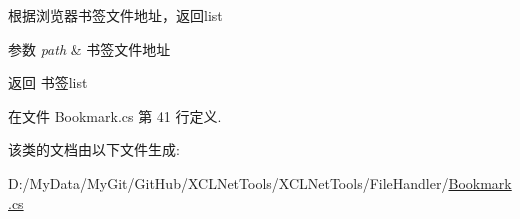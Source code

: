 根据浏览器书签文件地址，返回list 


\begin{DoxyParams}{参数}
{\em path} & 书签文件地址\\
\hline
\end{DoxyParams}
\begin{DoxyReturn}{返回}
书签list
\end{DoxyReturn}


在文件 Bookmark.\-cs 第 41 行定义.



该类的文档由以下文件生成\-:\begin{DoxyCompactItemize}
\item 
D\-:/\-My\-Data/\-My\-Git/\-Git\-Hub/\-X\-C\-L\-Net\-Tools/\-X\-C\-L\-Net\-Tools/\-File\-Handler/\hyperlink{_bookmark_8cs}{Bookmark.\-cs}\end{DoxyCompactItemize}
